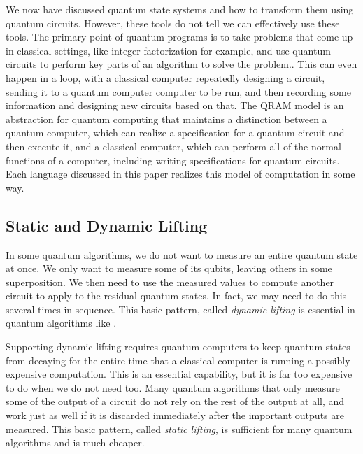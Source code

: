 We now have discussed quantum state systems and how to transform them using quantum circuits.
However, these tools do not tell we can effectively use these tools.
The primary point of quantum programs is to take problems that come up in classical settings, like integer factorization for example, and use quantum circuits to perform key parts of an algorithm to solve the problem..
This can even happen in a loop, with a classical computer repeatedly designing a circuit, sending it to a quantum computer computer to be run, and then recording some information and designing new circuits based on that.
The QRAM model is an abstraction for quantum computing that maintains a distinction between a quantum computer, which can realize a specification for a quantum circuit and then execute it, and a classical computer, which can perform all of the normal functions of a computer, including writing specifications for quantum circuits.
Each language discussed in this paper realizes this model of computation in some way.

\subsection{Static and Dynamic Lifting}
\label{sec:lifting}
In some quantum algorithms, we do not want to measure an entire quantum state at once.
We only want to measure some of its qubits, leaving others in some superposition.
We then need to use the measured values to compute another circuit to apply to the residual quantum states.
In fact, we may need to do this several times in sequence.
This basic pattern, called \emph{dynamic lifting} is essential in quantum algorithms like .

Supporting dynamic lifting requires quantum computers to keep quantum states from decaying for the entire time that a classical computer is running a possibly expensive computation. 
This is an essential capability, but it is far too expensive to do when we do not need too.
Many quantum algorithms that only measure some of the output of a circuit do not rely on the rest of the output at all, and work just as well if it is discarded immediately after the important outputs are measured.
This basic pattern, called \emph{static lifting}, is sufficient for many quantum algorithms and is much cheaper.

